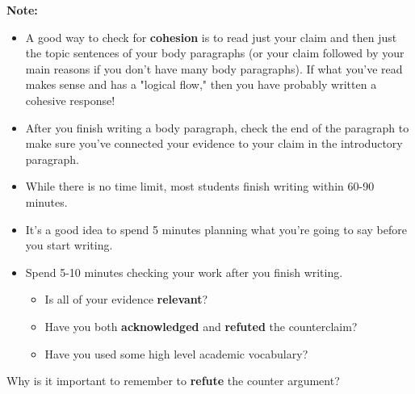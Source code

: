 \documentclass[12pt]{article}
\begin{document}
\begin{tcolorbox}[colframe=black!40, colback=gray!5, 
coltitle=black, colbacktitle=black!20, fonttitle=\bfseries\Large, 
title=Additional Notes, halign title=center, left=5pt, right=5pt, top=5pt, bottom=15pt]
\textbf{Note:}
\begin{itemize}
    \item A good way to check for \textbf{cohesion} is to read just your claim and then just the topic sentences of your body paragraphs (or your claim followed by your main reasons if you don't have many body paragraphs). If what you've read makes sense and has a "logical flow," then you have probably written a cohesive response!
    \item After you finish writing a body paragraph, check the end of the paragraph to make sure you've connected your evidence to your claim in the introductory paragraph. 
    \item While there is no time limit, most students finish writing within 60-90 minutes. 
    \item It's a good idea to spend 5 minutes planning what you're going to say before you start writing.
    \item Spend 5-10 minutes checking your work after you finish writing. 
    \begin{itemize}
        \item Is all of your evidence \textbf{relevant}?
        \item Have you both \textbf{acknowledged} and \textbf{refuted} the counterclaim?
        \item Have you used some high level academic vocabulary?
    \end{itemize}



\end{itemize}
\end{tcolorbox}

\vspace{1em}

\begin{tcolorbox}[colframe=black!60, colback=white, 
coltitle=black, colbacktitle=black!15, fonttitle=\bfseries\Large, 
title=Exit Ticket, halign title=center, left=10pt, right=10pt, top=10pt, bottom=15pt]
Why is it important to remember to \textbf{refute} the counter argument?
\vspace{15em}
\end{tcolorbox}
\end{document}
